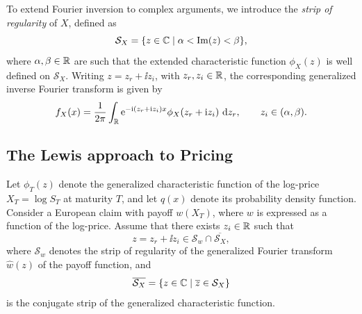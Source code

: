 To extend Fourier inversion to complex arguments, we introduce the \emph{strip of regularity}
of $X$, defined as
\[
  \mathcal{S}_X = \{ z \in \mathbb{C} \mid \alpha < \operatorname{Im}(z) < \beta \},
\]
where $\alpha,\beta \in \mathbb{R}$ are such that the extended characteristic function
$\phi_X(z)$ is well defined on $\mathcal{S}_X$. Writing $z = z_r + \ii z_i$, with
$z_r,z_i \in \mathbb{R}$, the corresponding generalized inverse Fourier transform is given by
\[
  f_X(x) = \frac{1}{2\pi} \int_{\mathbb{R}}
  \text{e}^{-\text{i} (z_r + \text{i} z_i)x}
  \phi_X(z_r + \text{i} z_i) \text{ d} z_r,
  \qquad z_i \in (\alpha,\beta).
\]

\subsection{The Lewis approach to Pricing}
\label{ssec:lewis}
Let $\phi_T(z)$ denote the generalized characteristic function of the log-price $X_T = \log S_T$ at
maturity $T$, and let $q(x)$ denote its probability density function. Consider a European claim with
payoff $w(X_T)$, where $w$ is expressed as a function of the log-price. Assume that there exists
$z_i \in \mathbb{R}$ such that
\[
  z = z_r + \ii z_i \in \mathcal{S}_w \cap \overline{\mathcal{S}_X},
\]
where $\mathcal{S}_w$ denotes the strip of regularity of the generalized Fourier transform
$\hat{w}(z)$ of the payoff function, and
\[
  \overline{\mathcal{S}_X}
  = \{z \in \mathbb{C} \mid \overline{z} \in \mathcal{S}_X\}
\]
is the conjugate strip of the generalized characteristic function.

